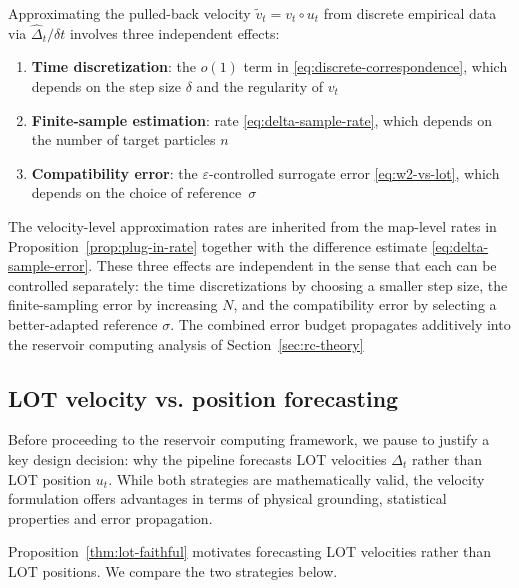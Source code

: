 \documentclass[11pt]{article}
\newcommand{\1}{\mathbf{1}}
\begin{document}
\begin{remark}\label{rmk:error-budget}
Approximating the pulled-back velocity $\widetilde v_t=v_t\circ u_t$ from
discrete empirical data via $\hat\Delta_t/\delta t$ involves three independent effects:
\begin{enumerate}[label=(\roman*)]
    \item \textbf{Time discretization}: the $o(1)$ term in \eqref{eq:discrete-correspondence}, which depends on the step size $\delta$ and the regularity of $v_t$
    \item \textbf{Finite-sample estimation}: rate
\eqref{eq:delta-sample-rate}, which depends on the number of target particles $n$
    \item \textbf{Compatibility error}: the $\varepsilon$-controlled surrogate error \eqref{eq:w2-vs-lot}, which depends on the choice of reference~$\sigma$
\end{enumerate}

The velocity-level approximation rates are inherited from the map-level rates in Proposition~\ref{prop:plug-in-rate} together with the difference estimate \eqref{eq:delta-sample-error}.
These three effects are independent in the sense that each can be controlled separately: the time discretizations by choosing a smaller step size, the finite-sampling error by increasing $N$, and the compatibility error by selecting a better-adapted reference $\sigma$. The combined error budget propagates additively into the reservoir computing analysis of Section~\ref{sec:rc-theory}
\end{remark}


\subsection{LOT velocity vs. position forecasting}\label{sec:lot-vs-raw}

Before proceeding to the reservoir computing framework, we pause to justify a key design decision: why the pipeline forecasts LOT velocities $\Delta_t$ rather than LOT position $u_t$. While both strategies are mathematically valid, the velocity formulation offers advantages in terms of physical grounding, statistical properties and error propagation.

Proposition~\ref{thm:lot-faithful} motivates forecasting LOT velocities rather than LOT positions. We compare the two strategies below.
\end{document}

